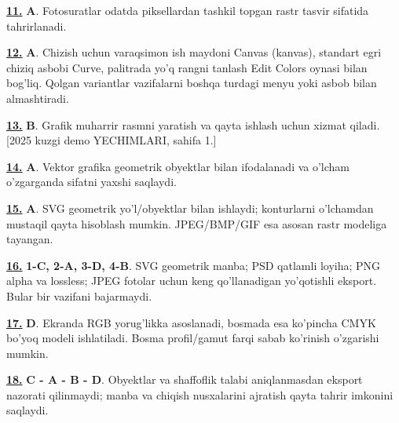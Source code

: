 \documentclass[10pt,a4paper,oneside]{article}
\begin{document}
\par\vspace{3mm}
\noindent\hyperlink{q11}{\textbf{11.}} \textbf{A}.  Fotosuratlar odatda piksellardan tashkil topgan rastr tasvir sifatida tahrirlanadi.
\par\vspace{3mm}
\noindent\hyperlink{q12}{\textbf{12.}} \textbf{A}.  Chizish uchun varaqsimon ish maydoni Canvas (kanvas), standart egri chiziq asbobi Curve, palitrada yo'q rangni tanlash Edit Colors oynasi bilan bog'liq. Qolgan variantlar vazifalarni boshqa turdagi menyu yoki asbob bilan almashtiradi.
\par\vspace{3mm}
\noindent\hyperlink{q13}{\textbf{13.}} \textbf{B}.  Grafik muharrir rasmni yaratish va qayta ishlash uchun xizmat qiladi. [2025 kuzgi demo YECHIMLARI, sahifa 1.]
\par\vspace{3mm}
\noindent\hyperlink{q14}{\textbf{14.}} \textbf{A}.  Vektor grafika geometrik obyektlar bilan ifodalanadi va o'lcham o'zgarganda sifatni yaxshi saqlaydi.
\par\vspace{3mm}
\noindent\hyperlink{q15}{\textbf{15.}} \textbf{A}.  SVG geometrik yo'l/obyektlar bilan ishlaydi; konturlarni o'lchamdan mustaqil qayta hisoblash mumkin. JPEG/BMP/GIF esa asosan rastr modeliga tayangan.
\par\vspace{3mm}
\noindent\hyperlink{q16}{\textbf{16.}} \textbf{1-C, 2-A, 3-D, 4-B}.  SVG geometrik manba; PSD qatlamli loyiha; PNG alpha va lossless; JPEG fotolar uchun keng qo'llanadigan yo'qotishli eksport. Bular bir vazifani bajarmaydi.
\par\vspace{3mm}
\noindent\hyperlink{q17}{\textbf{17.}} \textbf{D}.  Ekranda RGB yorug'likka asoslanadi, bosmada esa ko'pincha CMYK bo'yoq modeli ishlatiladi. Bosma profil/gamut farqi sabab ko'rinish o'zgarishi mumkin.
\par\vspace{3mm}
\noindent\hyperlink{q18}{\textbf{18.}} \textbf{C - A - B - D}.  Obyektlar va shaffoflik talabi aniqlanmasdan eksport nazorati qilinmaydi; manba va chiqish nusxalarini ajratish qayta tahrir imkonini saqlaydi.
\par\vspace{3mm}
\end{document}
